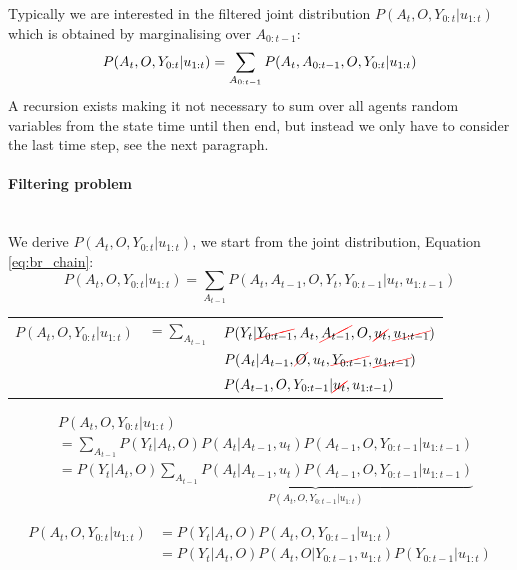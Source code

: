 \begin{appendices}
Typically we are interested in the filtered joint distribution $P(A_t,O,Y_{0:t}|u_{1:t})$ which 
is obtained by marginalising over $A_{0:t-1}$:
\begin{equation}
  P(A_t,O,Y_{0:t}|u_{1:t}) = \sum_{A_{0:t-1}}  P(A_t,A_{0:t-1},O,Y_{0:t}|u_{1:t}) \\
\end{equation}
A recursion exists making it not necessary to sum over all agents random variables from the state time 
until then end, but instead we only have to consider the last time step, see the next paragraph.

\paragraph{Filtering problem}\\
We derive $P(A_t,O,Y_{0:t}|u_{1:t})$, we start from the joint distribution, Equation \ref{eq:br_chain}:
\begin{equation}
   P(A_t,O,Y_{0:t}|u_{1:t})  = \sum_{A_{t-1}} P(A_t,A_{t-1},O,Y_t,Y_{0:t-1}|u_{t},u_{1:t-1}) \label{eq:br_chain} 
\end{equation}

\begin{tabular}{lll}
   $P(A_t,O,Y_{0:t}|u_{1:t})$ & $=\sum_{A_{t-1}}$ &  $P(Y_t|\Ccancel[red]{Y_{0:t-1}},A_t,\cancel{A_{t-1}},O,\cancel{u_{t}},\cancel{u_{1:t-1}}) $ \\
			      &  & $P(A_t|A_{t-1},\Ccancel[red]{O},u_{t},\Ccancel[red]{Y_{0:t-1}},\Ccancel[red]{u_{1:t-1}}) $ \\
			      &  & $P( A_{t-1},O,Y_{0:t-1}|\Ccancel[red]{u_t},u_{1:t-1})$
\end{tabular}

\begin{align}
  &P(A_t,O,Y_{0:t}|u_{1:t}) \\
  &= \sum_{A_{t-1}} P(Y_t|A_{t},O)  P(A_t|A_{t-1},u_{t})  P(A_{t-1},O,Y_{0:t-1}|u_{1:t-1}) \nonumber \\
  &= P(Y_t|A_{t},O)  \underbrace{\sum_{A_{t-1}} P(A_t|A_{t-1},u_t)  P(A_{t-1},O,Y_{0:t-1}|u_{1:t-1})}_{P(A_t,O,Y_{0:t-1}|u_{1:t})} 
\end{align}

\begin{align}
   P(A_t,O,Y_{0:t}|u_{1:t}) &= P(Y_t|A_{t},O)  P(A_t,O,Y_{0:t-1}|u_{1:t}) \nonumber \\
			    &= P(Y_t|A_{t},O)  P(A_t,O|Y_{0:t-1},u_{1:t})  P(Y_{0:t-1}|u_{1:t})
\end{align}


\end{appendices}
